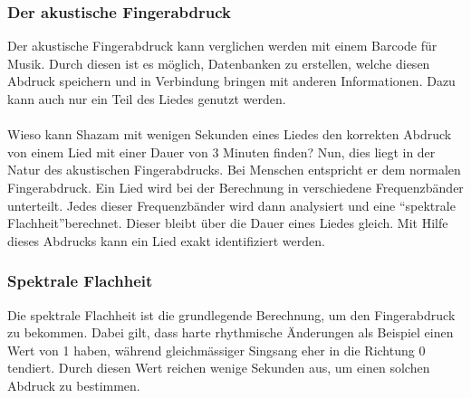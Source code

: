 \documentclass[12pt,a4paper,ngerman]{report}
\begin{document}
\subsubsection{Der akustische Fingerabdruck}
Der akustische Fingerabdruck kann verglichen werden mit einem Barcode für Musik. Durch diesen ist es möglich, Datenbanken zu erstellen, welche diesen Abdruck speichern und in Verbindung bringen mit anderen Informationen. Dazu kann auch nur ein Teil des Liedes genutzt werden.\\
\\
Wieso kann Shazam mit wenigen Sekunden eines Liedes den korrekten Abdruck von einem Lied mit einer Dauer von 3 Minuten finden? Nun, dies liegt in der Natur des akustischen Fingerabdrucks. Bei Menschen entspricht er dem normalen Fingerabdruck. Ein Lied wird bei der Berechnung in verschiedene Frequenzbänder unterteilt. Jedes dieser Frequenzbänder wird dann analysiert und eine \textquotedblleft spektrale Flachheit\textquotedblright berechnet. Dieser bleibt über die Dauer eines Liedes gleich. Mit Hilfe dieses Abdrucks kann ein Lied exakt identifiziert werden.
\subsubsection{Spektrale Flachheit}
Die spektrale Flachheit ist die grundlegende Berechnung, um den Fingerabdruck zu bekommen. Dabei gilt, dass harte rhythmische Änderungen als Beispiel einen Wert von 1 haben, während gleichmässiger Singsang eher in die Richtung 0 tendiert. Durch diesen Wert reichen wenige Sekunden aus, um einen solchen Abdruck zu bestimmen.
\end{document}
